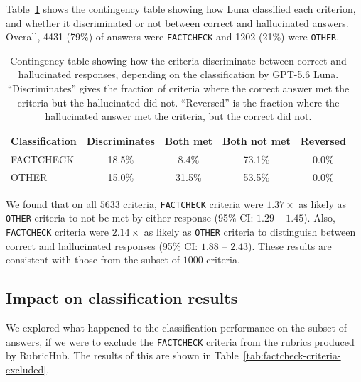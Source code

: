 \documentclass{article}
\begin{document}
Table~\ref{tab:classification_patterns} shows the contingency table showing how Luna classified each criterion, and whether it discriminated or not between correct and hallucinated answers. Overall, 4431 (79\%) of answers were \texttt{FACTCHECK} and 1202 (21\%) were \texttt{OTHER}.
\begin{table}[!h]
\centering
\begin{tabular}{lcccc}
\toprule
\textbf{Classification} & \textbf{Discriminates} & \textbf{Both met} & \textbf{Both not met} & \textbf{Reversed} \\
\midrule
FACTCHECK  & 18.5\% & 8.4\%  & 73.1\% & 0.0\% \\
OTHER      & 15.0\% & 31.5\% & 53.5\% & 0.0\% \\
\bottomrule
\end{tabular}
\caption{Contingency table showing how the criteria discriminate between correct and hallucinated responses, depending on the classification by GPT-5.6 Luna. ``Discriminates'' gives the fraction of criteria where the correct answer met the criteria but the hallucinated did not. ``Reversed'' is the fraction where the hallucinated answer met the criteria, but the correct did not.}
\label{tab:classification_patterns}
\end{table}
We found that on all $5633$ criteria, \texttt{FACTCHECK} criteria were $1.37\times$ as likely as \texttt{OTHER} criteria to not be met by either response (95\% CI: $1.29$ -- $1.45$). Also, \texttt{FACTCHECK} criteria were $2.14\times$ as likely as \texttt{OTHER} criteria to distinguish between correct and hallucinated responses (95\% CI: $1.88$ -- $2.43$). These results are consistent with those from the subset of $1000$ criteria.

\subsection*{Impact on classification results}
We explored what happened to the classification performance on the subset of answers, if we were to exclude the \texttt{FACTCHECK} criteria from the rubrics produced by RubricHub. The results of this are shown in Table~\ref{tab:factcheck-criteria-excluded}.
\end{document}
